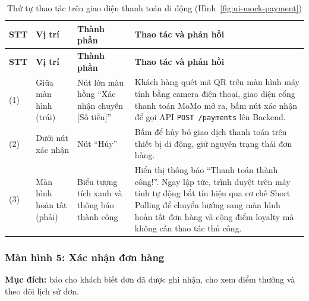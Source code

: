 \vspace{10pt}

\begin{minipage}{\textwidth}
  \centering
  \hfill
  \label{fig:ui-mock-payment}
\end{minipage}

\vspace{10pt}

\begin{longtable}{|p{1.0cm}|p{2.5cm}|p{4.5cm}|p{5.5cm}|}
  \caption{Thứ tự thao tác trên giao diện thanh toán di động (Hình~\ref{fig:ui-mock-payment})}\label{tab:wf-mobile-payment}\\
  \hline
  \textbf{STT} & \textbf{Vị trí} & \textbf{Thành phần} & \textbf{Thao tác và phản hồi} \\
  \hline
  \endfirsthead
  \hline
  \textbf{STT} & \textbf{Vị trí} & \textbf{Thành phần} & \textbf{Thao tác và phản hồi} \\
  \hline
  \endhead
  (1) & Giữa màn hình (trái) & Nút lớn màu hồng ``Xác nhận chuyển [Số tiền]'' & Khách hàng quét mã QR trên màn hình máy tính bằng camera điện thoại, giao diện cổng thanh toán MoMo mở ra, bấm nút xác nhận để gọi API \texttt{POST /payments} lên Backend. \\
  \hline
  (2) & Dưới nút xác nhận & Nút ``Hủy'' & Bấm để hủy bỏ giao dịch thanh toán trên thiết bị di động, giữ nguyên trạng thái đơn hàng. \\
  \hline
  (3) & Màn hình hoàn tất (phải) & Biểu tượng tích xanh và thông báo thành công & Hiển thị thông báo ``Thanh toán thành công!''. Ngay lập tức, trình duyệt trên máy tính tự động bắt tín hiệu qua cơ chế Short Polling để chuyển hướng sang màn hình hoàn tất đơn hàng và cộng điểm loyalty mà không cần thao tác thủ công. \\
  \hline
\end{longtable}

\subsubsection{Màn hình 5: Xác nhận đơn hàng}
\label{subsec:wf-xacnhan}
\textbf{Mục đích:} báo cho khách biết đơn đã được ghi nhận, cho xem điểm thưởng và theo dõi lịch sử đơn.

